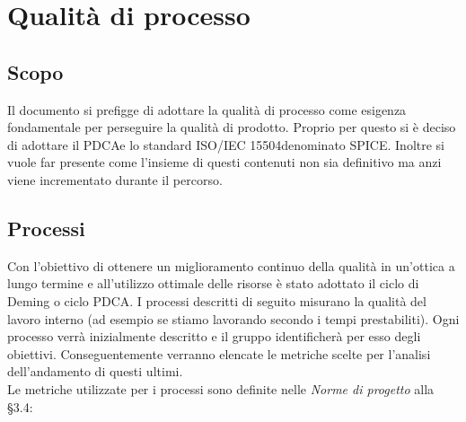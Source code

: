 \section{Qualità di processo}
\subsection{Scopo}
Il documento si prefigge di adottare la qualità di processo come esigenza fondamentale per perseguire la qualità di prodotto. Proprio per questo si è deciso di adottare il PDCA\pedice e lo standard ISO/IEC 15504\pedice denominato SPICE. Inoltre si vuole far presente come l'insieme di questi contenuti non sia definitivo ma anzi viene incrementato durante il percorso.
\subsection{Processi}
Con l'obiettivo di ottenere un miglioramento continuo della qualità in un'ottica a lungo termine e all'utilizzo ottimale delle risorse è stato adottato il ciclo di Deming o ciclo PDCA.\newline
I processi descritti di seguito misurano la qualità del lavoro interno (ad esempio se stiamo lavorando secondo i tempi prestabiliti).
Ogni processo verrà inizialmente descritto e il gruppo identificherà per esso degli obiettivi. Conseguentemente verranno elencate le metriche scelte per l'analisi dell'andamento di questi ultimi. \\
Le metriche utilizzate per i processi sono definite nelle \textit{Norme di progetto} alla §3.4:

